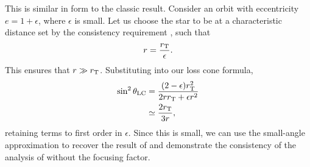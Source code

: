 This is similar in form to the classic result. Consider an orbit with eccentricity $e = 1 + \epsilon$, where $\epsilon$ is small. Let us choose the star to be at a characteristic distance set by the consistency requirement , such that
\begin{equation}
r = \dfrac{r_\mathrm{T}}{\epsilon}.
\end{equation}
This ensures that $r \gg r_\mathrm{T}$. Substituting into our loss cone formula,
\begin{align}
\sin^2\theta_\mathrm{LC} = {} & \dfrac{(2 - \epsilon)r_\mathrm{T}^2}{2rr_\mathrm{T} + \epsilon r^2} \nonumber \\
 \simeq {} & \dfrac{2r_\mathrm{T}}{3r},
\end{align}
retaining terms to first order in $\epsilon$. Since this is small, we can use the small-angle approximation to recover the result of  and demonstrate the consistency of the analysis of \citet{Frank1976} without the focusing factor.
